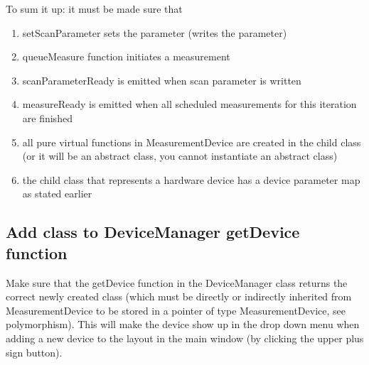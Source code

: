 \par\bigskip
To sum it up: it must be made sure that 
\begin{enumerate}
	\item setScanParameter sets the parameter (writes the parameter)
	\item queueMeasure function initiates a measurement
	\item scanParameterReady is emitted when scan parameter is written
	\item measureReady is emitted when all scheduled measurements for this iteration are finished
	\item all pure virtual functions in MeasurementDevice are created in the child class\\
	(or it will be an abstract class, you cannot instantiate an abstract class)
	\item the child class that represents a hardware device has a device parameter map as stated earlier
\end{enumerate}

\newpage
\subsection{Add class to DeviceManager getDevice function}
Make sure that the getDevice function in the DeviceManager class returns the correct newly created class (which must be directly or indirectly inherited from MeasurementDevice to be stored in a pointer of type MeasurementDevice, see polymorphism). This will make the device show up in the drop down menu when adding a new device to the layout in the main window (by clicking the upper plus sign button).
\par\smallskip
